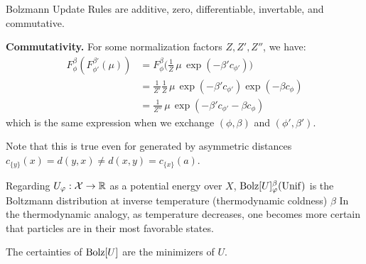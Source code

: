\begin{prop}
	Bolzmann Update Rules are additive, zero, differentiable, invertable, and commutative.
\end{prop}

\begin{lproof}
	\textbf{Commutativity.}
	For some normalization factors $Z, Z', Z''$, we have:
	\begin{align*}
		 F^\beta_\phi( F^{\beta'}_{\phi'}(\mu))
		 &= F^\beta_\phi \Big( \frac{1}{Z} \,\mu\, \exp(- \beta' c_{\phi'}) \Big) \\
		 &= \frac{1}{Z'} \frac{1}{Z} \,\mu\, \exp(- \beta' c_{\phi'}) \exp(- \beta c_{\phi}) \\
		 &= \frac{1}{Z''} \,\mu\, \exp(-\beta' c_{\phi'} - \beta c_\phi)
	\end{align*}
	which is the same expression when we exchange $(\phi, \beta)$ and $(\phi', \beta')$.
\end{lproof}

Note that this is true even for  generated by asymmetric distances $c_{\{y\}}(x) = d(y, x) \ne d(x,y) = c_{\{x\}}(a)$.


\begin{remark}
	Regarding $U_\varphi : \mathcal X \to \mathbb R$ as a potential energy over $X$,
	$\mathrm{Bolz}[U]^\beta_\varphi(\mathrm{Unif})$ is the Boltzmann distribution at inverse temperature (thermodynamic coldness) $\beta$
	In the thermodynamic analogy, as temperature decreases, one becomes more certain that particles are in their most favorable states.
\end{remark}


The certainties of $\mathrm{Bolz}[U]$ are the minimizers of $U$.




